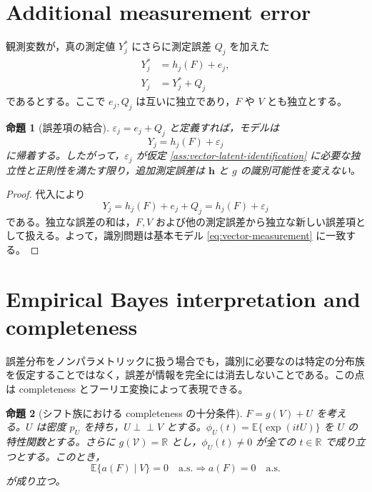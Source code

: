 \documentclass[10pt,a4paper]{article}
\newtheorem{proposition}{命題}
\newcommand{\indep}{\mathrel{\perp\!\!\!\perp}}
\newcommand{\E}{\mathbb{E}}
\newcommand{\R}{\mathbb{R}}
\newcommand{\1}{\mathbf{1}}
\newcommand{\calV}{\mathcal{V}}
\begin{document}
\section{Additional measurement error}
\label{app:additional-measurement-error}

観測変数が，真の測定値 $Y_j^*$ にさらに測定誤差 $Q_j$ を加えた
\begin{align}
  Y_j^*&=h_j(F)+e_j,\\
  Y_j&=Y_j^*+Q_j
\end{align}
であるとする。ここで $e_j,Q_j$ は互いに独立であり，$F$ や $V$ とも独立とする。

\begin{proposition}[誤差項の結合]
\label{prop:vector-error-combination}
$\varepsilon_j=e_j+Q_j$ と定義すれば，モデルは
\begin{equation}
  Y_j=h_j(F)+\varepsilon_j
\end{equation}
に帰着する。したがって，$\varepsilon_j$ が仮定 \ref{ass:vector-latent-identification} に必要な独立性と正則性を満たす限り，追加測定誤差は $\bm h$ と $g$ の識別可能性を変えない。
\end{proposition}

\begin{proof}
代入により
\begin{equation}
  Y_j=h_j(F)+e_j+Q_j=h_j(F)+\varepsilon_j
\end{equation}
である。独立な誤差の和は，$F,V$ および他の測定誤差から独立な新しい誤差項として扱える。よって，識別問題は基本モデル \eqref{eq:vector-measurement} に一致する。
\end{proof}

\section{Empirical Bayes interpretation and completeness}
\label{app:empirical-bayes-completeness}

誤差分布をノンパラメトリックに扱う場合でも，識別に必要なのは特定の分布族を仮定することではなく，誤差が情報を完全には消去しないことである。この点は completeness とフーリエ変換によって表現できる。

\begin{proposition}[シフト族における completeness の十分条件]
\label{prop:fourier-completeness}
$F=g(V)+U$ を考える。$U$ は密度 $p_U$ を持ち，$U\indep V$ とする。$\phi_U(t)=\E\{\exp(itU)\}$ を $U$ の特性関数とする。さらに $g(\calV)=\R$ とし，$\phi_U(t)\neq0$ が全ての $t\in\R$ で成り立つとする。このとき，
\begin{equation}
  \E\{a(F)\mid V\}=0\quad \mathrm{a.s.}
  \Longrightarrow
  a(F)=0\quad \mathrm{a.s.}
\end{equation}
が成り立つ。
\end{proposition}
\end{document}

